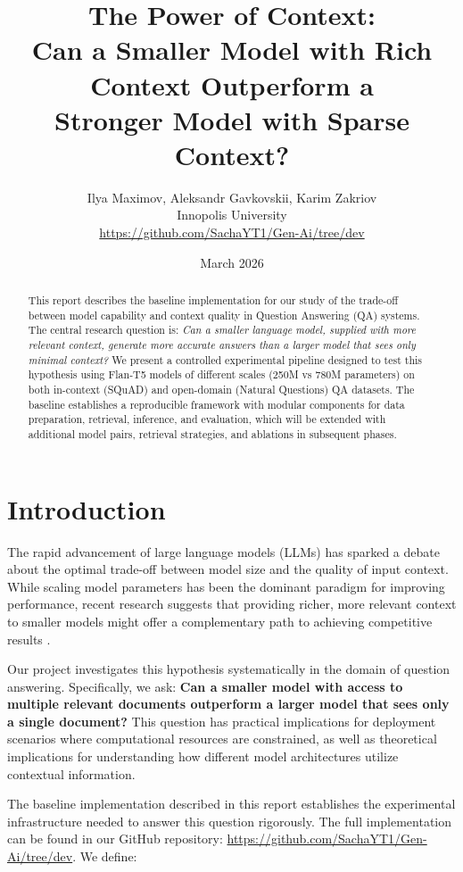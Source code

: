 \documentclass[11pt,a4paper]{article}
\title{\textbf{The Power of Context:} \\
Can a Smaller Model with Rich Context Outperform a \\
Stronger Model with Sparse Context? \\}
\author{Ilya Maximov, Aleksandr Gavkovskii, Karim Zakriov \\
Innopolis University \\
\url{https://github.com/SachaYT1/Gen-Ai/tree/dev}}
\date{March 2026}
\begin{document}
\maketitle

\begin{abstract}
This report describes the baseline implementation for our study of the trade-off between model capability and context quality in Question Answering (QA) systems. The central research question is: \textit{Can a smaller language model, supplied with more relevant context, generate more accurate answers than a larger model that sees only minimal context?} We present a controlled experimental pipeline designed to test this hypothesis using Flan-T5 models of different scales (250M vs 780M parameters) on both in-context (SQuAD) and open-domain (Natural Questions) QA datasets. The baseline establishes a reproducible framework with modular components for data preparation, retrieval, inference, and evaluation, which will be extended with additional model pairs, retrieval strategies, and ablations in subsequent phases.


\end{abstract}

\newpage

\section{Introduction}

The rapid advancement of large language models (LLMs) has sparked a debate about the optimal trade-off between model size and the quality of input context. While scaling model parameters has been the dominant paradigm for improving performance, recent research suggests that providing richer, more relevant context to smaller models might offer a complementary path to achieving competitive results \cite{liu2023lost, xu2024retrieval}.

Our project investigates this hypothesis systematically in the domain of question answering. Specifically, we ask: \textbf{Can a smaller model with access to multiple relevant documents outperform a larger model that sees only a single document?} This question has practical implications for deployment scenarios where computational resources are constrained, as well as theoretical implications for understanding how different model architectures utilize contextual information.

The baseline implementation described in this report establishes the experimental infrastructure needed to answer this question rigorously. The full implementation can be found in our GitHub repository: \url{https://github.com/SachaYT1/Gen-Ai/tree/dev}. We define:
\end{document}
